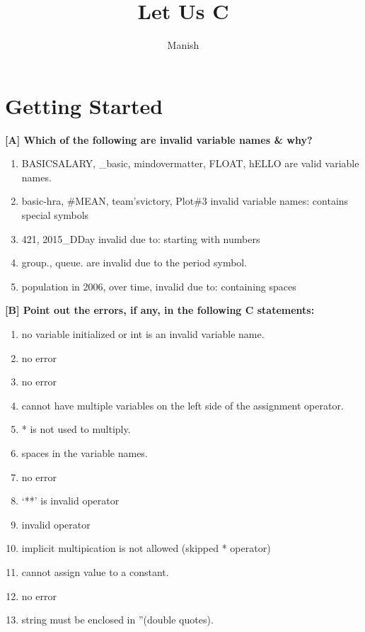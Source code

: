 \documentclass{report}
\title{Let Us C}
\author{Manish}
\begin{document}
\maketitle

\chapter{Getting Started}

\textbf{[A] Which of the following are invalid variable names \& why?}
\begin{enumerate}
    \renewcommand{\labelenumi}{\alph{enumi}}
  \item BASICSALARY, \_basic, mindovermatter, FLOAT, hELLO  
    \subitem are valid variable names.
  \item basic-hra, \#MEAN, team’svictory, Plot\#3
    \subitem invalid variable names: contains special symbols
  \item 421, 2015\_DDay
    \subitem invalid due to: starting with numbers
  \item group., queue.
    \subitem are invalid due to the period symbol.
  \item population in 2006, over time,
    \subitem invalid due to: containing spaces
\end{enumerate}

\textbf{[B] Point out the errors, if any, in the following C statements:}
\begin{enumerate}
    \renewcommand{\labelenumi}{\alph{enumi}}
  \item no variable initialized or int is an invalid variable name.
  \item no error
  \item no error
  \item cannot have multiple variables on the left side of the assignment operator.
  \item * is not used to multiply.
  \item spaces in the variable names.
  \item no error
  \item `**' is invalid operator
  \item invalid operator
  \item implicit multipication is not allowed (skipped * operator)
  \item cannot assign value to a constant.
  \item no error
  \item string must be enclosed in ''(double quotes).
\end{enumerate}
\end{document}
